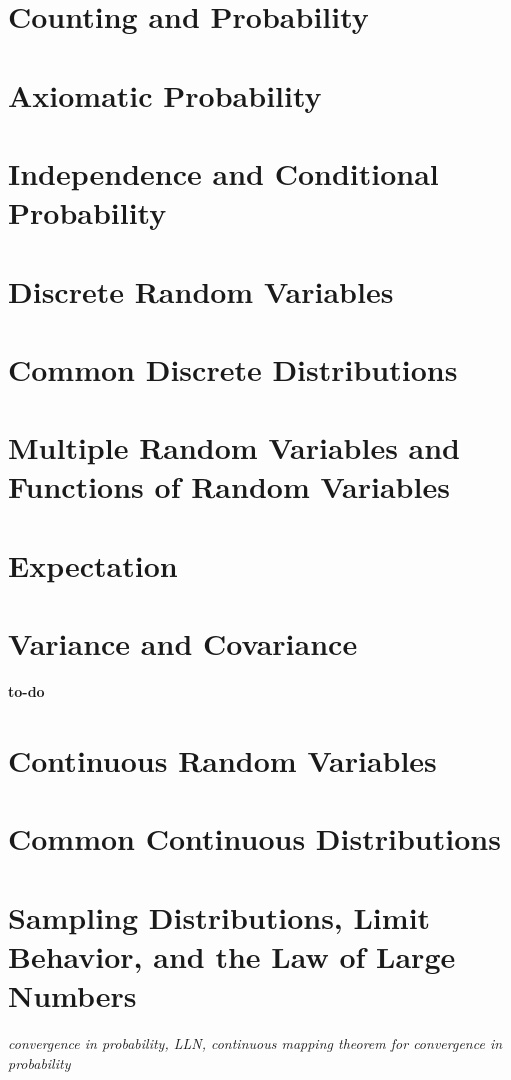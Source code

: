 \documentclass[../../../main.tex]{subfiles}
\begin{document}

\section{Counting and Probability}
\section{Axiomatic Probability}
\section{Independence and Conditional Probability}
\section{Discrete Random Variables}
\section{Common Discrete Distributions}
\section{Multiple Random Variables and Functions of Random Variables}
\section{Expectation}
\section{Variance and Covariance}
\begin{theorem}\label{thm:cauchy-schwartz-prob}
    \textbf{to-do}
\end{theorem}
\section{Continuous Random Variables}
\section{Common Continuous Distributions}
\section{Sampling Distributions, Limit Behavior, and the Law of Large Numbers}
\textit{convergence in probability, LLN, continuous mapping theorem for convergence in probability}
\end{document}
